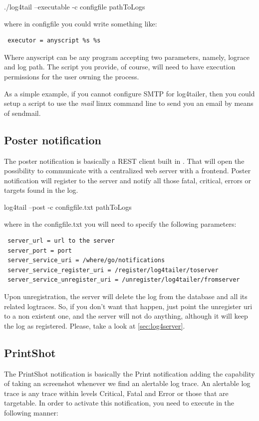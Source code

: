 \begin{cmd}
 ./log4tail --executable -c configfile pathToLogs
\end{cmd}

where in configfile you could write something like:

\begin{verbatim}
 executor = anyscript %s %s 
\end{verbatim}

Where anyscript can be any program accepting two parameters, namely, lograce and log path. The script 
you provide, of course, will need to have execution permissions for the user 
owning the \logftailer{} process. 

As a simple example, if you cannot configure SMTP for log4tailer, then you could 
setup a script to use the \emph{mail} linux command line to send you an email by means of sendmail.

\subsection{Poster notification}
\label{sec:poster}
The poster notification is basically a REST client built in \logftailer{}. That will open 
the possibility to communicate with a centralized web server with a frontend. Poster 
notification will register to the server and notify all those fatal, critical, errors or 
targets found in the log. 
\begin{cmd}
 log4tail --post -c configfile.txt pathToLogs
\end{cmd}
where in the configfile.txt you will need to specify the following parameters:

\begin{config}
\begin{verbatim}
 server_url = url to the server
 server_port = port
 server_service_uri = /where/go/notifications
 server_service_register_uri = /register/log4tailer/toserver
 server_service_unregister_uri = /unregister/log4tailer/fromserver
\end{verbatim}
\end{config}

Upon unregistration, the server will delete the log from the database and all its related 
logtraces. So, if you don't want that happen, just point the unregister uri to a non existent one, 
and the server will not do anything, although it will keep the log as registered. Please, take a 
look at \autoref{sec:log4server}.

\subsection{PrintShot}
\label{sec:PrintShot}
The PrintShot notification is basically the Print notification adding the
capability of taking an screenshot whenever we find an alertable log trace. An
alertable log trace is any trace within levels Critical, Fatal and Error or
those that are targetable. In order to activate this notification, you need to
execute \logftailer{} in the following manner:

